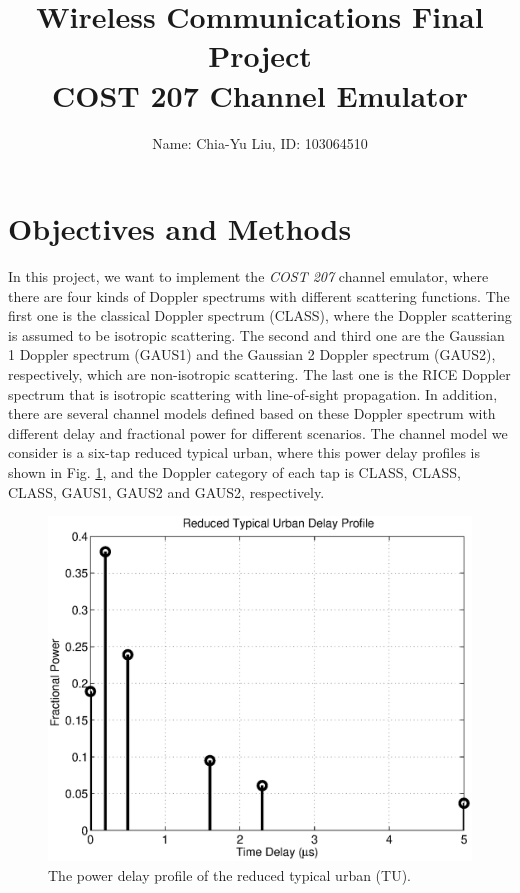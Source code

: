 \documentclass[12pt, draftclsnofoot, onecolumn]{IEEEtran}
\title{Wireless Communications Final Project \\COST 207 Channel Emulator}
\author{Name: Chia-Yu Liu, ID: 103064510}
\date{	}
\begin{document}
\maketitle
\section{Objectives and Methods}
In this project, we want to implement the \textit{COST 207} channel emulator, where there are four kinds of Doppler spectrums with different scattering functions. The first one is the classical Doppler spectrum (CLASS), where the Doppler scattering is assumed to be isotropic scattering. The second and third one are the Gaussian 1 Doppler spectrum (GAUS1) and the Gaussian 2 Doppler spectrum (GAUS2), respectively, which are non-isotropic scattering. The last one is the RICE Doppler spectrum that is isotropic scattering with line-of-sight propagation. In addition, there are several channel models defined based on these Doppler spectrum with different delay and fractional power for different scenarios. The channel model we consider is a six-tap reduced typical urban, where this power delay profiles is shown in Fig. \ref{fig:delay_profile}, and the Doppler category of each tap is CLASS, CLASS, CLASS, GAUS1, GAUS2 and GAUS2, respectively.

\begin{figure}[t]
\centering
\includegraphics[width=.6\linewidth]{power_delay_profile.eps}
\caption{The power delay profile of the reduced typical urban (TU).}\label{fig:delay_profile}
\end{figure}
\end{document}
